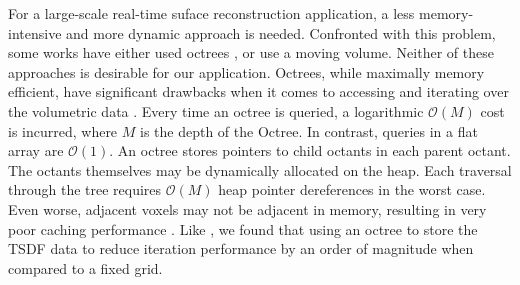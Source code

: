 \documentclass[conference]{IEEEtran}
\newcommand{\TSDF}{TSDF\xspace}
\begin{document}
For a large-scale real-time suface reconstruction application, a less
memory-intensive and more dynamic approach is needed. Confronted with this
problem, some works have either used  octrees \cite{Wurm2010, Zeng2012,
Chen2012}, or use a moving volume\cite{Whelan2013}. Neither of these approaches
is desirable for our application. Octrees, while maximally memory efficient,
have significant drawbacks when it comes to accessing and iterating over the
volumetric data \cite{NiessnerHashing}. Every time an octree is queried,  a
logarithmic $\mathcal{O}(M)$ cost is incurred, where $M$ is the depth of the
Octree. In contrast, queries in a flat array are $\mathcal{O}(1)$. An octree
stores pointers to child octants in each parent octant. The octants themselves
may be dynamically allocated on the heap. Each traversal through the tree
requires $\mathcal{O}(M)$ heap pointer dereferences in the worst case.
Even worse, adjacent voxels may not be adjacent in memory, resulting in very
poor caching performance \cite{CacheStructures}.  Like \cite{NiessnerHashing},
we found that using an octree to store the \TSDF data to reduce iteration
performance by an order of magnitude when compared to a fixed grid.
\end{document}
